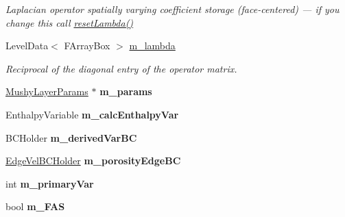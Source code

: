 \begin{DoxyCompactItemize}
\begin{DoxyCompactList}\small\item\em Laplacian operator spatially varying coefficient storage (face-\/centered) --- if you change this call \hyperlink{class_a_m_r_liquid_conc_op_a7db78d52b946b8706d83328f5f49f3e1}{reset\-Lambda()} \end{DoxyCompactList}\item 
\hypertarget{class_a_m_r_liquid_conc_op_ad07d80b3c081fa8c627aef56b84b0882}{Level\-Data$<$ F\-Array\-Box $>$ \hyperlink{class_a_m_r_liquid_conc_op_ad07d80b3c081fa8c627aef56b84b0882}{m\-\_\-lambda}}\label{class_a_m_r_liquid_conc_op_ad07d80b3c081fa8c627aef56b84b0882}

\begin{DoxyCompactList}\small\item\em Reciprocal of the diagonal entry of the operator matrix. \end{DoxyCompactList}\item 
\hypertarget{class_a_m_r_liquid_conc_op_a5f01cae782fbec2bfa93fe9f0e148259}{\hyperlink{class_mushy_layer_params}{Mushy\-Layer\-Params} $\ast$ {\bfseries m\-\_\-params}}\label{class_a_m_r_liquid_conc_op_a5f01cae782fbec2bfa93fe9f0e148259}

\item 
\hypertarget{class_a_m_r_liquid_conc_op_aea5f1c124be6c8ee23e97f006bb21560}{Enthalpy\-Variable {\bfseries m\-\_\-calc\-Enthalpy\-Var}}\label{class_a_m_r_liquid_conc_op_aea5f1c124be6c8ee23e97f006bb21560}

\item 
\hypertarget{class_a_m_r_liquid_conc_op_a066fdd931094068219a5aba57bb87b2e}{B\-C\-Holder {\bfseries m\-\_\-derived\-Var\-B\-C}}\label{class_a_m_r_liquid_conc_op_a066fdd931094068219a5aba57bb87b2e}

\item 
\hypertarget{class_a_m_r_liquid_conc_op_ae3f9806e7cafc89368178bd9c2f1925e}{\hyperlink{class_edge_vel_b_c_holder}{Edge\-Vel\-B\-C\-Holder} {\bfseries m\-\_\-porosity\-Edge\-B\-C}}\label{class_a_m_r_liquid_conc_op_ae3f9806e7cafc89368178bd9c2f1925e}

\item 
\hypertarget{class_a_m_r_liquid_conc_op_a892cc7b15bafedf4b8fc3b8b76483a8d}{int {\bfseries m\-\_\-primary\-Var}}\label{class_a_m_r_liquid_conc_op_a892cc7b15bafedf4b8fc3b8b76483a8d}

\item 
\hypertarget{class_a_m_r_liquid_conc_op_a2583f9ca1b8e758443de63c65c844aba}{bool {\bfseries m\-\_\-\-F\-A\-S}}\label{class_a_m_r_liquid_conc_op_a2583f9ca1b8e758443de63c65c844aba}

\end{DoxyCompactItemize}
